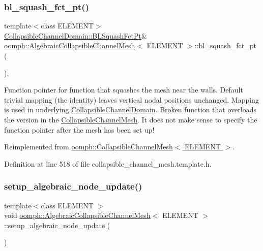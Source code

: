 \subsubsection{\texorpdfstring{bl\+\_\+squash\+\_\+fct\+\_\+pt()}{bl\_squash\_fct\_pt()}}
{\footnotesize\ttfamily template$<$class E\+L\+E\+M\+E\+NT$>$ \\
\hyperlink{classoomph_1_1CollapsibleChannelDomain_a2bf1d7943bfac134a5c27a54c7e1faed}{Collapsible\+Channel\+Domain\+::\+B\+L\+Squash\+Fct\+Pt}\& \hyperlink{classoomph_1_1AlgebraicCollapsibleChannelMesh}{oomph\+::\+Algebraic\+Collapsible\+Channel\+Mesh}$<$ E\+L\+E\+M\+E\+NT $>$\+::bl\+\_\+squash\+\_\+fct\+\_\+pt (\begin{DoxyParamCaption}{ }\end{DoxyParamCaption})\hspace{0.3cm}{\ttfamily [inline]}, {\ttfamily [virtual]}}



Function pointer for function that squashes the mesh near the walls. Default trivial mapping (the identity) leaves vertical nodal positions unchanged. Mapping is used in underlying \hyperlink{classoomph_1_1CollapsibleChannelDomain}{Collapsible\+Channel\+Domain}. Broken function that overloads the version in the \hyperlink{classoomph_1_1CollapsibleChannelMesh}{Collapsible\+Channel\+Mesh}. It does not make sense to specify the function pointer after the mesh has been set up! 



Reimplemented from \hyperlink{classoomph_1_1CollapsibleChannelMesh_aac6057b4e572cb47923570b5e9c781c4}{oomph\+::\+Collapsible\+Channel\+Mesh$<$ E\+L\+E\+M\+E\+N\+T $>$}.



Definition at line 518 of file collapsible\+\_\+channel\+\_\+mesh.\+template.\+h.

\mbox{\label{classoomph_1_1AlgebraicCollapsibleChannelMesh_a54e93316a561cd77a68c0774d2772030}} 
\subsubsection{\texorpdfstring{setup\+\_\+algebraic\+\_\+node\+\_\+update()}{setup\_algebraic\_node\_update()}}
{\footnotesize\ttfamily template$<$class E\+L\+E\+M\+E\+NT $>$ \\
void \hyperlink{classoomph_1_1AlgebraicCollapsibleChannelMesh}{oomph\+::\+Algebraic\+Collapsible\+Channel\+Mesh}$<$ E\+L\+E\+M\+E\+NT $>$\+::setup\+\_\+algebraic\+\_\+node\+\_\+update (\begin{DoxyParamCaption}{ }\end{DoxyParamCaption})\hspace{0.3cm}{\ttfamily [protected]}}



